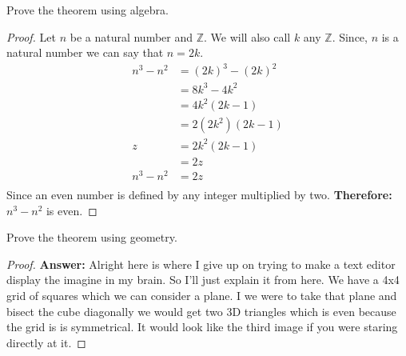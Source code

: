 \documentclass{article}
\begin{document}
\begin{itemize}
    \item[b.] Prove the theorem using algebra.
    \item[] 
    \begin{proof}
        Let $n$ be a natural number and $\mathbb{Z}$. We will also call $k$ any $\mathbb{Z}$. 
        Since, $n$ is a natural number we can say that $n = 2k$.
        \begin{align*}
            n^3 - n^2 &= (2k)^3 - (2k)^2 \\
            &= 8k^3 - 4k^2 \\
            &= 4k^2(2k - 1) \\
            &= 2(2k^2)(2k - 1) \\
            z&= 2k^2(2k - 1) \\
            &= 2z \\
            n^3 - n^2 &= 2z \\
        \end{align*}
        Since an even number is defined by any integer multiplied by two.\newline
        \textbf{Therefore:} $n^3 - n^2$ is even.
    \end{proof}
    \item[c.] Prove the theorem using geometry.
    \item[]
    \begin{proof}

\item[]
\item[] \textbf{Answer:} Alright here is where I give up on trying to make a text editor display the imagine in my brain. 
So I'll just explain it from here. We have a 4x4 grid of squares which we can consider a plane. I we were to take that plane and
bisect the cube diagonally we would get two 3D triangles which is even because the grid is is symmetrical. It would look like the 
third image if you were staring directly at it.
\end{proof}
\end{itemize}    
\end{document}
